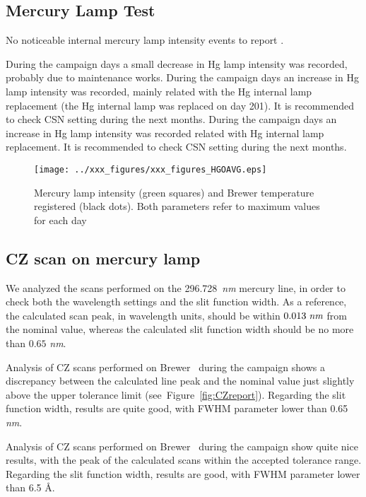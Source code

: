 \subsection{Mercury Lamp Test} \label{subsec:HG}
No noticeable internal mercury lamp intensity events to report .

During the campaign days a small decrease in Hg lamp intensity was recorded, probably due to maintenance works.
During the campaign days an increase in Hg lamp intensity was recorded, mainly related with the Hg internal lamp replacement (the Hg internal lamp was replaced on day 201). It is recommended to check CSN setting during the next months.
During the campaign days an increase in Hg lamp intensity was recorded related with Hg internal lamp replacement. It is recommended to check CSN setting during the next months.

\begin{figure}[hbtp!]
\begin{center}
\texttt{[image: ../xxx\_figures/xxx\_figures\_HGOAVG.eps]}
           \caption{Mercury lamp intensity (green squares) and Brewer temperature registered (black dots). Both parameters refer to maximum values for each day}
           \label{fig:HGAVG}
\end{center}
\end{figure}

\subsection{CZ scan on mercury lamp} \label{subsec:CZ}
We analyzed the scans performed on the 296.728\ \emph{nm} mercury line, in order to check both the wavelength settings and the slit function width. As a reference, the calculated scan peak, in wavelength units, should be within $ 0.013\;\emph{nm}$ from the nominal value, whereas the calculated slit function width should be no more than $0.65$ \emph{nm}.

Analysis of CZ scans performed on Brewer \textbf{\brwname}\ during the campaign shows a discrepancy between the calculated line peak and the nominal value just slightly above the upper tolerance limit \mbox{(see Figure \ref{fig:CZreport})}.
Regarding the slit function width, results are quite good, with FWHM parameter lower than 0.65 \emph{nm}.

Analysis of CZ scans performed on Brewer \textbf{\brwname}\ during the campaign show quite nice results, with the peak of the calculated scans within the accepted tolerance range.\\
Regarding the slit function width, results are good, with FWHM parameter lower than 6.5 \AA.

